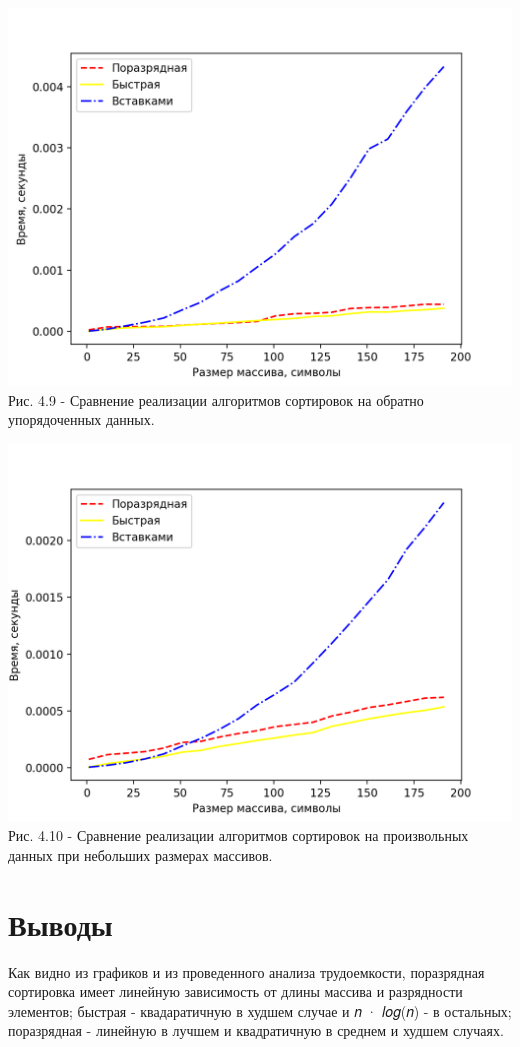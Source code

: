 	\begin{center}
        \includegraphics[scale = 1]{./pictures/graph6} \\ Рис. 4.9 - Сравнение реализации алгоритмов сортировок на обратно упорядоченных данных.
	\end{center}
	\begin{center}
        \includegraphics[scale = 1]{./pictures/graph7} \\ Рис. 4.10 - Сравнение реализации алгоритмов сортировок на произвольных данных при небольших размерах
        массивов.
	\end{center}
\section{Выводы}
Как видно из графиков и из проведенного анализа трудоемкости, поразрядная сортировка имеет
линейную зависимость от длины массива и разрядности элементов; быстрая - квадаратичную в худшем
случае и 𝑛 · 𝑙𝑜𝑔(𝑛) - в остальных; поразрядная - линейную в лучшем и квадратичную в среднем и худшем
случаях.
\pagebreak

